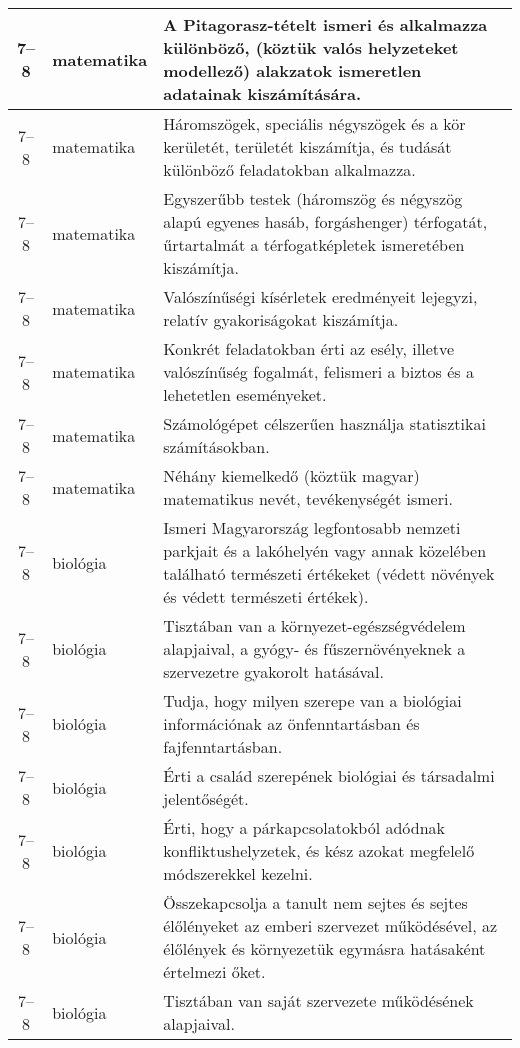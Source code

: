 \begin{small}
\begin{longtable}{c | p{2cm} |  p{11cm} }
              7--8 & matematika & A Pitagorasz-tételt ismeri és alkalmazza különböző, (köztük valós helyzeteket modellező) alakzatok ismeretlen adatainak kiszámítására. \\ \hline
              7--8 & matematika & Háromszögek, speciális négyszögek és a kör kerületét, területét kiszámítja, és tudását különböző feladatokban alkalmazza. \\ \hline
              7--8 & matematika & Egyszerűbb testek (háromszög és négyszög alapú egyenes hasáb, forgáshenger) térfogatát, űrtartalmát a térfogatképletek ismeretében kiszámítja. \\ \hline
              7--8 & matematika & Valószínűségi kísérletek eredményeit lejegyzi, relatív gyakoriságokat kiszámítja. \\ \hline
              7--8 & matematika & Konkrét feladatokban érti az esély, illetve valószínűség fogalmát, felismeri a biztos és a lehetetlen eseményeket. \\ \hline
              7--8 & matematika & Számológépet célszerűen használja statisztikai számításokban. \\ \hline
              7--8 & matematika & Néhány kiemelkedő (köztük magyar) matematikus nevét, tevékenységét ismeri. \\ \hline
              7--8 & biológia & Ismeri Magyarország legfontosabb nemzeti parkjait és a lakóhelyén vagy annak közelében található természeti értékeket (védett növények és védett természeti értékek). \\ \hline
              7--8 & biológia & Tisztában van a környezet-egészségvédelem alapjaival, a gyógy- és fűszernövényeknek a szervezetre gyakorolt hatásával. \\ \hline
              7--8 & biológia & Tudja, hogy milyen szerepe van a biológiai információnak az önfenntartásban és fajfenntartásban. \\ \hline
              7--8 & biológia & Érti a család szerepének biológiai és társadalmi jelentőségét. \\ \hline
              7--8 & biológia & Érti, hogy a párkapcsolatokból adódnak konfliktushelyzetek, és kész azokat megfelelő módszerekkel kezelni. \\ \hline
              7--8 & biológia & Összekapcsolja a tanult nem sejtes és sejtes élőlényeket az emberi szervezet működésével, az élőlények és környezetük egymásra hatásaként értelmezi őket. \\ \hline
              7--8 & biológia & Tisztában van saját szervezete működésének alapjaival. \\ \hline

\end{longtable}
\end{small}
